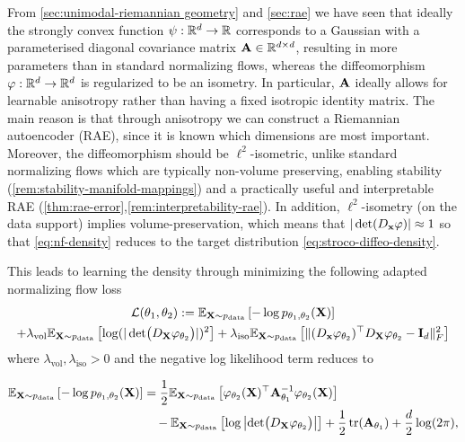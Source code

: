 From \ref{sec:unimodal-riemannian geometry} and \ref{sec:rae} we have seen that ideally the strongly convex function $\psi: \mathbb{R}^{d} \to \mathbb{R}$ corresponds to a Gaussian with a parameterised diagonal covariance matrix $\mathbf{A} \in \mathbb{R}^{d\times d}$, resulting in more parameters than in standard normalizing flows, whereas the diffeomorphism $\varphi: \mathbb{R}^{d} \to \mathbb{R}^{d}$ is regularized to be an isometry. In particular, $\mathbf{A}$ ideally allows for learnable anisotropy rather than having a fixed isotropic identity matrix. The main reason is that through anisotropy we can construct a Riemannian autoencoder (RAE), since it is known which dimensions are most important. Moreover, the diffeomorphism should be $\ell^2$-isometric, unlike standard normalizing flows which are typically non-volume preserving, enabling stability (\ref{rem:stability-manifold-mappings}) and a practically useful and interpretable RAE  (\ref{thm:rae-error},\ref{rem:interpretability-rae}). In addition, $\ell^2$-isometry (on the data support) implies volume-preservation, which means that $|\det(D_{\mathbf{x}} \varphi)| \approx 1$ so that \ref{eq:nf-density} reduces to the target distribution \ref{eq:stroco-diffeo-density}.

This leads to learning the density through minimizing the following adapted normalizing flow loss
\begin{multline}
    \mathcal{L}(\theta_1, \theta_2) := \mathbb{E}_{\mathbf{X} \sim p_{\text{data}}}\left[-\log p_{\theta_1, \theta_2}(\mathbf{X})\right] \\
    + \lambda_{\text{vol}} \mathbb{E}_{\mathbf{X} \sim p_{\text{data}}}\left[ \log(|\det \bigl( D_{\mathbf{X}} \varphi_{\theta_2} \bigr)|)^2 \right] +
    \lambda_{\text{iso}} \mathbb{E}_{\mathbf{X} \sim p_{\text{data}}}\left[ \|  (D_{\mathbf{x}} \varphi_{\theta_2})^\top D_{\mathbf{X}} \varphi_{\theta_2}  - \mathbf{I}_d\|_F^2 \right]
\end{multline}
where $\lambda_{\text{vol}}, \lambda_{\text{iso}} >0$ and the negative log likelihood term reduces to

\begin{align}
    \mathbb{E}_{\mathbf{X} \sim p_{\text{data}}}\left[-\log p_{\theta_1, \theta_2}(\mathbf{X})\right] 
    &= \frac{1}{2}\mathbb{E}_{\mathbf{X} \sim p_{\text{data}}}\left[\varphi_{\theta_2}(\mathbf{X})^\top \mathbf{A}_{\theta_1}^{-1} \varphi_{\theta_2}(\mathbf{X}) \right] \notag \\
    &\quad - \mathbb{E}_{\mathbf{X} \sim p_{\text{data}}}\left[ \log\left|\det \bigl( D_{\mathbf{X}} \varphi_{\theta_2} \bigr)\right| \right] + \frac{1}{2} \operatorname{tr}(\mathbf{A}_{\theta_1}) + \frac{d}{2}\log(2\pi),
    \end{align}
    



